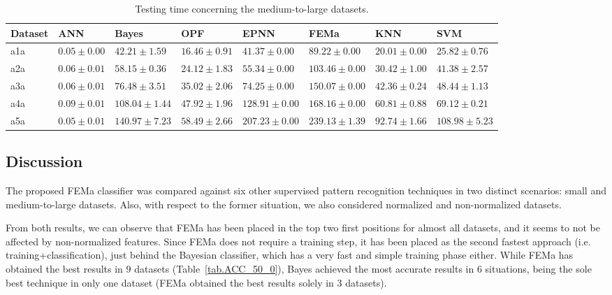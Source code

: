 \begin{table*}[!htb]
\begin{center}
\caption{\label{tab.L_TST_TIME}Testing time concerning the medium-to-large datasets.}
\scriptsize
\begin{tabular}{l||l|l|l|l|l|l|l}
Dataset & ANN   & Bayes  & OPF & EPNN & FEMa & KNN  & SVM     \\ \hline \hline
a1a& $ 0.05 \pm 0.00$& $ 42.21 \pm 1.59$& $ 16.46 \pm 0.91$& $ 41.37 \pm 0.00$& $ 89.22 \pm 0.00$& $ 20.01 \pm 0.00$& $ 25.82 \pm 0.76$ \\ 
a2a& $ 0.06 \pm 0.01$& $ 58.15 \pm 0.36$& $ 24.12 \pm 1.83$& $ 55.34 \pm 0.00$& $ 103.46 \pm 0.00$& $ 30.42 \pm 1.00$& $ 41.38 \pm 2.57$ \\ 
a3a& $ 0.06 \pm 0.01$& $ 76.48 \pm 3.51$& $ 35.02 \pm 2.06$& $ 74.25 \pm 0.00$& $ 150.07 \pm 0.00$& $ 42.36 \pm 0.24$& $ 48.44 \pm 1.13$ \\ 
a4a& $ 0.09 \pm 0.01$& $ 108.04 \pm 1.44$& $ 47.92 \pm 1.96$& $ 128.91 \pm 0.00$& $ 168.16 \pm 0.00$& $ 60.81 \pm 0.88$& $ 69.12 \pm 0.21$ \\ 
a5a& $ 0.05 \pm 0.01$& $ 140.97 \pm 7.23$& $ 58.49 \pm 2.66$& $ 207.23 \pm 0.00$& $ 239.13 \pm 1.39$& $ 92.74 \pm 1.66$ & $108.98 \pm 5.23$\\ \hline
\end{tabular}
\end{center}
\end{table*}

\subsection{Discussion}
\label{ss.discussion}

The proposed FEMa classifier was compared against six other supervised pattern recognition techniques in two distinct scenarios: small and medium-to-large datasets. Also, with respect to the former situation, we also considered normalized and non-normalized datasets.

From both results, we can observe that FEMa has been placed in the top two first positions for almost all datasets, and it seems to not be affected by non-normalized features. Since FEMa does not require a training step, it has been placed as the second fastest approach (i.e. training+classification), just behind the Bayesian classifier, which has a very fast and simple training phase either. While FEMa has obtained the best results in $9$ datasets (Table~\ref{tab.ACC_50_0}), Bayes achieved the most accurate results in $6$ situations, being the sole best technique in only one dataset (FEMa obtained the best results solely in $3$ datasets).

